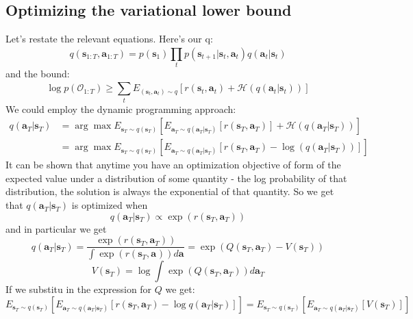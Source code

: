 \documentclass{report}
\newcommand{\argmax}{\arg\!\max}
\begin{document}
\subsection{Optimizing the variational lower bound}
Let's restate the relevant equations. Here's our q:
\begin{equation}
q (\bm{s}_{1:T}, \bm{a}_{1:T} ) = p (\bm{s}_{1}) \prod_{t}^{} p (\bm{s}_{t+1}|\bm{s}_{t}, \bm{a}_{t}) q (\bm{a}_{t}| \bm{s}_{t} )
\end{equation}
and
the bound:
\begin{equation}
		\log p (\mathcal{O}_{ 1:T }) \geq
		\sum_{t}^{} E_{ (\bm{s}_{t}, \bm{a}_{t} )\sim q} 
		\left[ r(\bm{s}_{t}, \bm{a}_{t} ) + \mathcal{H} (q(\bm{a}_{t}| \bm{s}_{t} )) \right] 
\end{equation}
We could employ the dynamic programming approach:
\begin{align}
		q(\bm{a}_{T}| \bm{s}_{T} ) 
		&= \argmax_{} E_{ \bm{s}_{T} \sim q (\bm{s}_{T}) } \left[ 
E_{ \bm{a}_{T}\sim q(\bm{a}_{T}| \bm{s}_{T} ) } \left[ r (\bm{s}_{T}, \bm{a}_{T} ) \right] 
+ \mathcal{H} (q(\bm{a}_{T}| \bm{s}_{T} ))
\right] \\
&= \argmax_{} E_{ \bm{s}_{T} \sim q (\bm{s}_{T}) } \left[ 
E_{ \bm{a}_{T}\sim q(\bm{a}_{T}| \bm{s}_{T} ) } \left[ r (\bm{s}_{T}, \bm{a}_{T} ) 
- \log (q(\bm{a}_{T}| \bm{s}_{T} ))
\right] \right] 
\end{align}
It can be shown that anytime you have an optimization objective of form
of the expected value under a distribution of some quantity - the log
probability of that distribution,
the solution is always the exponential of that quantity.
So we get that $ q(\bm{a}_{T}| \bm{s}_{T} )  $ is optimized when
\begin{equation}
		q(\bm{a}_{T}| \bm{s}_{T} ) \propto \exp (r(\bm{s}_{T}, \bm{a}_{T} ))
\end{equation}
and in particular we get
\begin{equation}
		q(\bm{a}_{T}| \bm{s}_{T} ) =
		\frac{\exp (r(\bm{s}_{T}, \bm{a}_{T} ))}{\int \exp (r(\bm{s}_{T}, \bm{a}_{} ))d\bm{a}_{}} = 
		\exp (Q(\bm{s}_{T}, \bm{a}_{T} ) - V (\bm{s}_{T}))
\end{equation}
\begin{equation}
		V (\bm{s}_{T}) = \log \int \exp (Q(\bm{s}_{T}, \bm{a}_{T} ))d \bm{a}_{T}
\end{equation}
If we substitu in the expression for $ Q  $ we get:
\begin{equation}
E_{ \bm{s}_{T}\sim q (\bm{s}_{T}) }
\left[ 
E_{ \bm{a}_{T} \sim q(\bm{a}_{T}| \bm{s}_{T} ) }
\left[ 
r(\bm{s}_{T}, \bm{a}_{T} ) - \log q(\bm{a}_{T}| \bm{s}_{T} )
\right] 
\right] 
=
E_{ \bm{s}_{T}\sim q (\bm{s}_{T}) } \left[ 
E_{ \bm{a}_{T} \sim q(\bm{a}_{T}| \bm{s}_{T} ) } \left[ V (\bm{s}_{T}) \right] 
\right] 
\end{equation}
\end{document}
